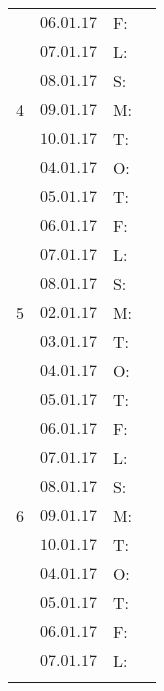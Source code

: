 \documentclass{article}
\begin{document}
\begin{center}
\begin{tabular}{|c|l|l|l|}
          & $06.01.17$       & F:    &              \\\rowcolor{gainsboro}
          & $07.01.17$       & L:    &              \\    
          & $08.01.17$       & S:    &              \\
\hline                                                 \rowcolor{gainsboro}    
4	      & $09.01.17$       & M:    &              \\
          & $10.01.17$       & T:    &              \\ \rowcolor{gainsboro}
          & $04.01.17$       & O:    &              \\
          & $05.01.17$       & T:    &              \\ \rowcolor{gainsboro}
          & $06.01.17$       & F:    &              \\
          & $07.01.17$       & L:    &              \\ \rowcolor{gainsboro}  
          & $08.01.17$       & S:    &              \\
\hline                                                         
5	      & $02.01.17$       & M:    &              \\\rowcolor{gainsboro}
          & $03.01.17$       & T:    &              \\
          & $04.01.17$       & O:    &              \\\rowcolor{gainsboro}
          & $05.01.17$       & T:    &              \\
          & $06.01.17$       & F:    &              \\\rowcolor{gainsboro}
          & $07.01.17$       & L:    &              \\    
          & $08.01.17$       & S:    &              \\
\hline                                                 \rowcolor{gainsboro}    
6	      & $09.01.17$       & M:    &              \\
          & $10.01.17$       & T:    &              \\ \rowcolor{gainsboro}
          & $04.01.17$       & O:    &              \\
          & $05.01.17$       & T:    &              \\ \rowcolor{gainsboro}
          & $06.01.17$       & F:    &              \\
          & $07.01.17$       & L:    &              \\ \rowcolor{gainsboro}  

\end{tabular}
\end{center}
\end{document}

